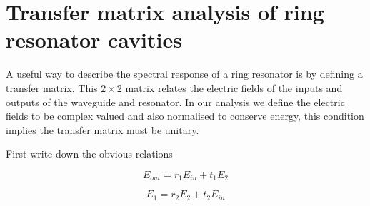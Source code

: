 \section{Transfer matrix analysis of ring resonator cavities}
\label{ringResAppen}
A useful way to describe the spectral response of a ring resonator is by defining a transfer matrix. This $2\times2$ matrix relates the electric fields of the inputs and outputs of the waveguide and resonator. In our analysis we define the electric fields to be complex valued and also normalised to conserve energy, this condition implies the transfer matrix must be unitary.

First write down the obvious relations

\begin{equation}
E_{out}=r_1E_{in}+t_1E_2
\end{equation}

\begin{equation}
E_{1}=r_2E_2+t_2E_{in}
\end{equation}

